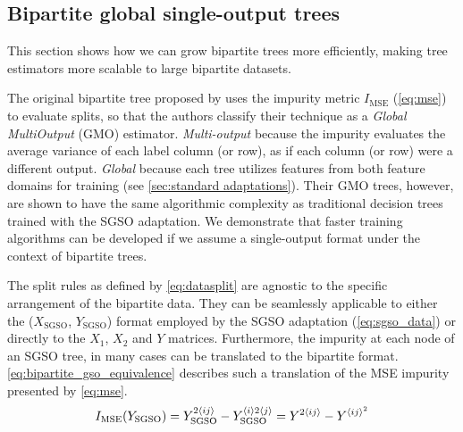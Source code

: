 
\subsection{Bipartite global single-output trees}
\label{sec:bgso_trees}

This section shows how we can grow bipartite trees more efficiently, making tree estimators more scalable to large bipartite datasets.

The original bipartite tree proposed by \cite{pliakos2018global} uses the impurity metric $I_\text{MSE}$ (\autoref{eq:mse}) to evaluate splits, so that the authors classify their technique as a \emph{Global MultiOutput} (GMO) estimator. \emph{Multi-output} because the impurity evaluates the average variance of each label column (or row), as if each column (or row) were a different output. \emph{Global} because each tree utilizes features from both feature domains for training (see \autoref{sec:standard adaptations}).
Their GMO trees, however, are shown to have the same algorithmic complexity as traditional decision trees trained with the SGSO adaptation. We demonstrate that faster training algorithms can be developed if we assume a single-output format under the context of bipartite trees. %

The split rules as defined by \autoref{eq:datasplit} are agnostic to the specific arrangement of the bipartite data. They can be seamlessly applicable to either the ($X_\text{SGSO}$, $Y_\text{SGSO}$) format employed by the SGSO adaptation (\autoref{eq:sgso_data}) or directly to the $X_1$, $X_2$ and $Y$ matrices.
Furthermore, the impurity at each node of an SGSO tree,
in many cases can be translated to the bipartite format. \autoref{eq:bipartite_gso_equivalence} describes such a translation of the MSE impurity presented by \autoref{eq:mse}.
%
\begin{equation}
    I_\text{MSE}(Y_\text{SGSO})
        = Y_\text{SGSO}^{2\langle ij\rangle} - Y_\text{SGSO}^{\langle i\rangle 2 \langle j\rangle}
        = Y^{2\langle ij\rangle} - Y^{\langle ij\rangle^2}
    \label{eq:bipartite_gso_equivalence}
\end{equation}
 
